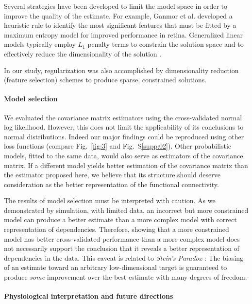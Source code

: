 \documentclass[10pt]{article}
\begin{document}
Several strategies have been developed to limit the model space in order to improve the quality of the estimate. For example, Ganmor et al. \cite{Ganmor:2011} developed a heuristic rule to identify the most significant features that must be fitted by a maximum entropy model for improved performance in retina. Generalized linear models typically employ $L_1$ penalty terms to constrain the solution space and to effectively reduce the dimensionality of the solution \cite{Pillow:2008}.  

In our study, regularization was also accomplished by dimensionality reduction (feature selection) schemes to produce sparse, constrained solutions.


\paragraph{Model selection}
We evaluated the covariance matrix estimators using the cross-validated normal log likelihood.  However, this does not limit the applicability of its conclusions to normal distributions. Indeed our major findings could be reproduced using other loss functions (compare Fig.~\ref{fig:3} and Fig.~S\ref{supp:02}).  Other probabilistic models, fitted to the same data, would also serve as estimators of the covariance matrix.  If a different model yields better estimation of the covariance matrix than the estimator proposed here, we believe that its structure should deserve consideration as the better representation of the functional connectivity.

The results of model selection must be interpreted with caution.  As we demonstrated by simulation, with limited data, an incorrect but more constrained model can produce a better estimate than a more complex model with correct representation of dependencies.   Therefore, showing that a more constrained model has better cross-validated performance than a more complex model does not necessarily support the conclusion that it reveals a better representation of dependencies in the data.  This caveat is related to \emph{Stein's Paradox} \cite{Efron:1977}: The biasing of an estimate toward an arbitrary low-dimensional target is guaranteed to produce \emph{some} improvement over the best estimate with many degrees of freedom.

\paragraph{Physiological interpretation and future directions}
\end{document}

